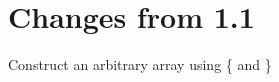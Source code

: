\chapter{Changes from 1.1}

\begin{itemlist}
\item Construct an arbitrary array using \{ and \}
\end{itemlist}

